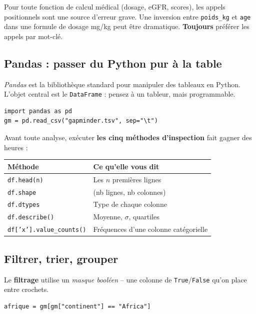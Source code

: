 \documentclass[11pt,a4paper]{article}
\begin{document}
\begin{attention}
Pour toute fonction de calcul m\'edical (dosage, eGFR, scores), les
appels positionnels sont une source d'erreur grave. Une inversion entre
\texttt{poids\_kg} et \texttt{age} dans une formule de dosage mg/kg peut
\^etre dramatique. \textbf{Toujours} pr\'ef\'erer les appels par mot-cl\'e.
\end{attention}

\subsection{Pandas : passer du Python pur \`a la table}

\emph{Pandas} est la biblioth\`eque standard pour manipuler des tableaux
en Python. L'objet central est le \texttt{DataFrame} : pensez \`a un
tableur, mais programmable.

\begin{verbatim}
import pandas as pd
gm = pd.read_csv("gapminder.tsv", sep="\t")
\end{verbatim}

Avant toute analyse, ex\'ecuter \textbf{les cinq m\'ethodes d'inspection}
fait gagner des heures :

\begin{table}[h]
\centering
\begin{tabular}{ll}
\toprule
\bfseries M\'ethode & \bfseries Ce qu'elle vous dit \\
\midrule
\texttt{df.head(n)}      & Les $n$ premi\`eres lignes \\
\texttt{df.shape}        & (nb lignes, nb colonnes) \\
\texttt{df.dtypes}       & Type de chaque colonne \\
\texttt{df.describe()}   & Moyenne, $\sigma$, quartiles \\
\texttt{df['x'].value\_counts()} & Fr\'equences d'une colonne cat\'egorielle \\
\bottomrule
\end{tabular}
\end{table}

\subsection{Filtrer, trier, grouper}

Le \textbf{filtrage} utilise un \emph{masque bool\'een} -- une colonne de
\texttt{True}/\texttt{False} qu'on place entre crochets.

\begin{verbatim}
afrique = gm[gm["continent"] == "Africa"]
\end{verbatim}
\end{document}
